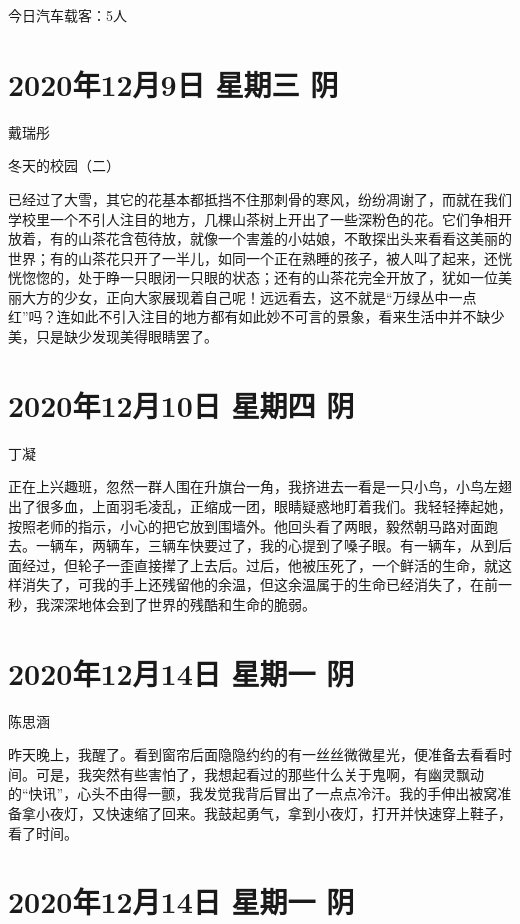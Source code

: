 今日汽车载客：5人

\section{2020年12月9日 星期三 阴}

戴瑞彤

冬天的校园（二）

已经过了大雪，其它的花基本都抵挡不住那刺骨的寒风，纷纷凋谢了，而就在我们学校里一个不引人注目的地方，几棵山茶树上开出了一些深粉色的花。它们争相开放着，有的山茶花含苞待放，就像一个害羞的小姑娘，不敢探出头来看看这美丽的世界；有的山茶花只开了一半儿，如同一个正在熟睡的孩子，被人叫了起来，还恍恍惚惚的，处于睁一只眼闭一只眼的状态；还有的山茶花完全开放了，犹如一位美丽大方的少女，正向大家展现着自己呢！远远看去，这不就是“万绿丛中一点红”吗？连如此不引入注目的地方都有如此妙不可言的景象，看来生活中并不缺少美，只是缺少发现美得眼睛罢了。

\section{2020年12月10日 星期四 阴}

丁凝

正在上兴趣班，忽然一群人围在升旗台一角，我挤进去一看是一只小鸟，小鸟左翅出了很多血，上面羽毛凌乱，正缩成一团，眼睛疑惑地盯着我们。我轻轻捧起她，按照老师的指示，小心的把它放到围墙外。他回头看了两眼，毅然朝马路对面跑去。一辆车，两辆车，三辆车快要过了，我的心提到了嗓子眼。有一辆车，从到后面经过，但轮子一歪直接撵了上去后。过后，他被压死了，一个鲜活的生命，就这样消失了，可我的手上还残留他的余温，但这余温属于的生命已经消失了，在前一秒，我深深地体会到了世界的残酷和生命的脆弱。

\section{2020年12月14日 星期一 阴}

陈思涵

昨天晚上，我醒了。看到窗帘后面隐隐约约的有一丝丝微微星光，便准备去看看时间。可是，我突然有些害怕了，我想起看过的那些什么关于鬼啊，有幽灵飘动的“快讯”，心头不由得一颤，我发觉我背后冒出了一点点冷汗。我的手伸出被窝准备拿小夜灯，又快速缩了回来。我鼓起勇气，拿到小夜灯，打开并快速穿上鞋子，看了时间。

\section{2020年12月14日 星期一 阴}


